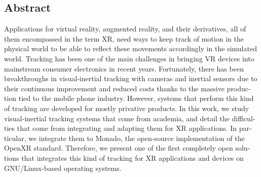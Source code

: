 \begin{otherlanguage}{american}
\chapter*{Abstract}

Applications for virtual reality, augmented reality, and their
derivatives, all of them encompassed in the term XR, need ways to keep track of
motion in the physical world to be able to reflect these movements accordingly
in the simulated world. Tracking has been one of the main
challenges in bringing VR devices into mainstream consumer electronics in recent
years. Fortunately, there has been breakthroughs in visual-inertial
tracking with cameras and inertial sensors due to their continuous improvement and
reduced costs thanks to the massive production tied to the mobile phone industry. However,
systems that perform this kind of tracking are developed for mostly privative
products. In this work, we study visual-inertial tracking systems that come
from academia, and detail the difficulties that come from integrating and
adapting them for XR applications. In particular, we integrate them to Monado,
the open-source implementation of the OpenXR standard. Therefore, we present one
of the first completely open solutions that integrates this kind of tracking for
XR applications and devices on GNU/Linux-based operating systems.

\end{otherlanguage}

\endgroup

\vfill
